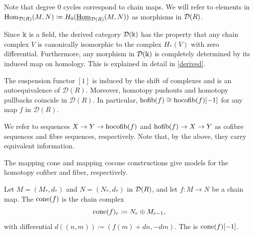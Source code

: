 Note that degree \(0\) cycles correspond to chain maps.
We will refer to elements in \(\mathrm{Hom}_{\mathcal{D}(R)}(M, N) \coloneqq H_0(\underline{\mathrm{Hom}}_{\mathcal{D}(R)}(M, N))\) as morphisms in \(\mathcal{D}(R)\).

\begin{remark}\label{DFpmorph}
	Since \(\Bbbk\) is a field, the derived category \(\mathcal{D}(\Bbbk)\) has the property that any chain complex \(V\) is canonically isomorphic to the complex \(H_*(V)\) with zero differential.
	Furthermore, any morphism in \(\mathcal D(\Bbbk)\) is completely determined by its induced map on homology. This is explained in detail in \cref{derived}.
\end{remark}

The suspension functor \([1]\) is induced by the shift of complexes and is an autoequivalence of \(\mathcal D(R)\).
Moreover, homotopy pushouts and homotopy pullbacks coincide in \(\mathcal D(R)\).
In particular, \(\operatorname{hofib}(f) \cong \operatorname{hocofib}(f)[-1]\) for any map \(f\) in \(\mathcal D(R)\).

We refer to sequences \(X \to Y \to \operatorname{hocofib}(f)\) and \(\operatorname{hofib}(f) \to X \to Y\) as cofibre sequences and fibre sequences, respectively.
Note that, by the above, they carry equivalent information.

The mapping cone and mapping cocone constructions give models for the homotopy cofiber and fiber, respectively.

\begin{definition}
	Let \(M=(M_*,d_*)\) and \(N=(N_*,d_*)\) in \(\mathcal{D}(R)\), and let \(f \colon M \to N\) be a chain map. The  \(\operatorname{cone}(f)\) is the chain complex
	\[
	\operatorname{cone}(f)_r \coloneqq N_r \oplus M_{r-1},
	\]
	with differential \(d((n,m)) \coloneqq (f(m)+dn, -dm)\).
	The  is \(\operatorname{cone}(f)[-1]\). 
\end{definition}


	
